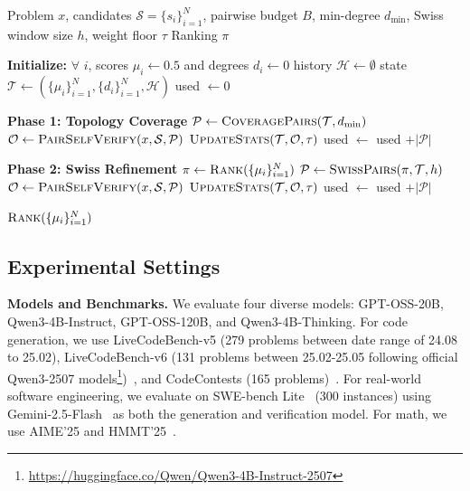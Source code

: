 \begin{algorithm}[t]
\caption{Uncertainty-Guided Pairwise Ranking}
\label{alg:ugpr}
\footnotesize
\begin{algorithmic}[1]
\Require Problem $x$, candidates $\mathcal{S}=\{s_i\}_{i=1}^N$, pairwise budget $B$,
min-degree $d_{\min}$, Swiss window size $h$, weight floor $\tau$
\Ensure Ranking $\pi$

\State \textbf{Initialize:} $\forall$ $i$, scores $\mu_i \gets 0.5$ and degrees $d_i\gets 0$
\State \hspace{1.0em} history $\mathcal{H}\gets\emptyset$ 
\State \hspace{1.0em} state $\mathcal{T}\gets (\{\mu_i\}_{i=1}^N,\{d_i\}_{i=1}^N,\mathcal{H})$
\State used $\gets 0$

\Statex \textbf{Phase 1: Topology Coverage}
    \State $\mathcal{P} \gets \Call{CoveragePairs}{\mathcal{T}, d_{\min}}$
    \State $\mathcal{O} \gets \Call{PairSelfVerify}{x,\mathcal{S},\mathcal{P}}$ 
    \State $\Call{UpdateStats}{\mathcal{T}, \mathcal{O}, \tau}$ 
    \State used $\gets$ used $+|\mathcal{P}|$
\EndWhile

\Statex \textbf{Phase 2: Swiss Refinement}
    \State $\pi \gets \Call{Rank}{\{\mu_i\}_{i=1}^N}$ 
    \State $\mathcal{P} \gets \Call{SwissPairs}{\pi, \mathcal{T}, h}$ 
    \State $\mathcal{O} \gets \Call{PairSelfVerify}{x,\mathcal{S},\mathcal{P}}$
    \State $\Call{UpdateStats}{\mathcal{T}, \mathcal{O}, \tau}$
    \State used $\gets$ used $+|\mathcal{P}|$
\EndWhile

\State \Return $\Call{Rank}{\{\mu_i\}_{i=1}^N}$
\end{algorithmic}
\end{algorithm}


\subsection{Experimental Settings}

\textbf{Models and Benchmarks.} We evaluate four diverse models: GPT-OSS-20B, Qwen3-4B-Instruct, GPT-OSS-120B, and Qwen3-4B-Thinking. For code generation, we use LiveCodeBench-v5 (279 problems between date range of 24.08 to 25.02), LiveCodeBench-v6 (131 problems between 25.02-25.05 following official Qwen3-2507 models\footnote{\hyperlink{https://huggingface.co/Qwen/Qwen3-4B-Instruct-2507}{https://huggingface.co/Qwen/Qwen3-4B-Instruct-2507}})~\citep{jain2024livecodebench}, and CodeContests (165 problems)~\citep{li2022codecontests}. For real-world software engineering, we evaluate on SWE-bench Lite~\citep{jimenez2024swebench} (300 instances) using Gemini-2.5-Flash~\citep{comanici2025gemini25} as both the generation and verification model. For math, we use AIME'25 and HMMT'25~\citep{balunovic_srimatharena_2025}.

